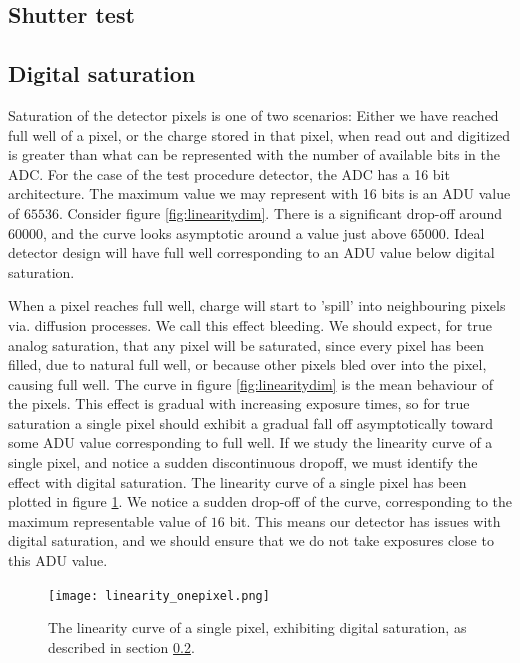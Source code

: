 \documentclass[../main.tex]{subfiles}
\begin{document}
		\subsection{Shutter test}
		
		\subsection{Digital saturation}\label{sect:digsat}
		Saturation of the detector pixels is one of two scenarios: Either we have reached full well of a pixel, or the charge stored in that pixel, when read out and digitized is greater than what can be represented with the number of available bits in the ADC. For the case of the test procedure detector, the ADC has a 16 bit architecture. The maximum value we may represent with 16 bits is an ADU value of $65536$. Consider figure \ref{fig:linearitydim}. There is a significant drop-off around $60000$, and the curve looks asymptotic around a value just above $65000$. Ideal detector design will have full well corresponding to an ADU value below digital saturation. 
		
		When a pixel reaches full well, charge will start to 'spill' into neighbouring pixels via. diffusion processes. We call this effect bleeding. We should expect, for true analog saturation, that any pixel will be saturated, since every pixel has been filled, due to natural full well, or because other pixels bled over into the pixel, causing full well. The curve in figure \ref{fig:linearitydim} is the mean behaviour of the pixels. This effect is gradual with increasing exposure times, so for true saturation a single pixel should exhibit a gradual fall off asymptotically toward some ADU value corresponding to full well. If we study the linearity curve of a single pixel, and notice a sudden discontinuous dropoff, we must identify the effect with digital saturation. The linearity curve of a single pixel has been plotted in figure \ref{fig:linearitydimonepix}. We notice a sudden drop-off of the curve, corresponding to the maximum representable value of $16$ bit. This means our detector has issues with digital saturation, and we should ensure that we do not take exposures close to this ADU value.
		
		\begin{figure}
			\centering			\texttt{[image: linearity\_onepixel.png]}
			\caption{The linearity curve of a single pixel, exhibiting digital saturation, as described in section \ref{sect:digsat}. }
			\label{fig:linearitydimonepix}
		\end{figure}
		
\end{document}
